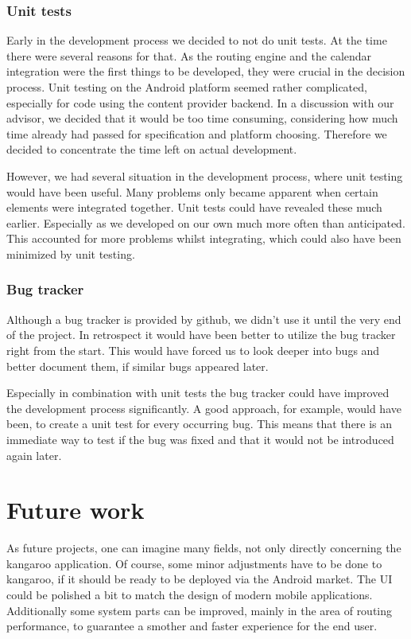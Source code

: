 \subsubsection{Unit tests} %
\label{ssub:Unittests}
Early in the development process we decided to not do unit tests.
At the time there were several reasons for that.
As the routing engine and the calendar integration were the first
things to be developed, they were crucial in the decision process.
Unit testing on the Android platform seemed rather complicated,
especially for code using the content provider backend. In a discussion
with our advisor, we decided that it would be too time consuming,
considering how much time already had passed for specification and
platform choosing. Therefore we decided to concentrate the time left
on actual development.

However, we had several situation in the development process, where
unit testing would have been useful. Many problems only became
apparent when certain elements were integrated together. Unit tests
could have revealed these much earlier. Especially as we developed
on our own much more often than anticipated. This accounted for more
problems whilst integrating, which could also have been minimized by
unit testing.


\subsubsection{Bug tracker} %
\label{ssub:Bugtracker}
Although a bug tracker is provided by github, we didn't use it
until the very end of the project. In retrospect it would have been
better to utilize the bug tracker right from the start. This would
have forced us to look deeper into bugs and better document them, if
similar bugs appeared later.

Especially in combination with unit tests the bug tracker could have
improved the development process significantly. A good approach, for
example, would have been, to create a unit test for every occurring bug.
This means that there is an immediate way to test if the bug was
fixed and that it would not be introduced again later.

\section{Future work}
As future projects, one can imagine many fields, not only directly concerning
the kangaroo application. Of course, some minor adjustments have to be done to
kangaroo, if it should be ready to be deployed via the Android market. The UI
could be polished a bit to match the design of modern mobile applications.
Additionally some system parts can be improved, mainly in the area of routing
performance, to guarantee a smother and faster experience for the end user.

